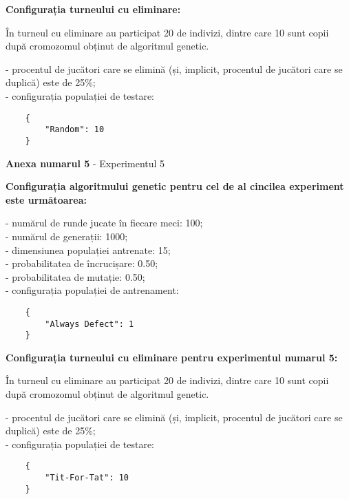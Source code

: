 \textbf{Configurația turneului cu eliminare: }

În turneul cu eliminare au participat 20 de indivizi, dintre care 10 sunt copii după cromozomul obținut de algoritmul genetic. 

- procentul de jucători care se elimină (și, implicit, procentul de jucători care se duplică) este de 25\%;\\
- configurația populației de testare:\\
\begin{center}
	\begin{lstlisting}
	{
		"Random": 10
	}
	\end{lstlisting}
\end{center}

\clearpage

\begin{center}
	\textbf{Anexa numarul 5} - Experimentul 5
\end{center}

\textbf{Configurația algoritmului genetic pentru cel de al cincilea experiment este următoarea:}

- numărul de runde jucate în fiecare meci: 100;\\
- numărul de generații: 1000;\\
- dimensiunea populației antrenate: 15;\\
- probabilitatea de încrucișare: 0.50;\\
- probabilitatea de mutație: 0.50;\\
- configurația populației de antrenament:\\
\begin{center}
	\begin{lstlisting}
	{
		"Always Defect": 1
	}
	\end{lstlisting}
\end{center}

\textbf{Configurația turneului cu eliminare pentru experimentul numarul 5:}

În turneul cu eliminare au participat 20 de indivizi, dintre care 10 sunt copii după cromozomul obținut de algoritmul genetic. 

- procentul de jucători care se elimină (și, implicit, procentul de jucători care se duplică) este de 25\%;\\
- configurația populației de testare:\\
\begin{center}
	\begin{lstlisting}
	{
		"Tit-For-Tat": 10
	}
	\end{lstlisting}
\end{center}

